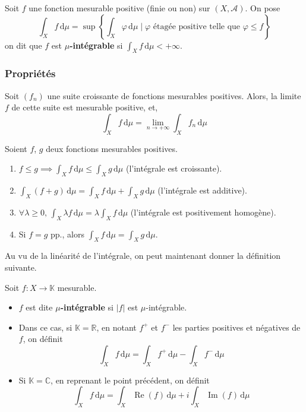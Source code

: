   \begin{definition}
    Soit $f$ une fonction mesurable positive (finie ou non) sur $(X, \mathcal{A})$. On pose
    \[ \int_X f \, \mathrm{d}\mu = \sup \left\{ \int_X \varphi \, \mathrm{d}\mu \mid \varphi \text{ étagée positive telle que } \varphi \leq f \right\} \]
    on dit que $f$ est \textbf{$\mu$-intégrable} si $\int_X f \, \mathrm{d}\mu < +\infty$.
  \end{definition}

  \subsubsection{Propriétés}

  \begin{theorem}
    Soit $(f_n)$ une suite croissante de fonctions mesurables positives. Alors, la limite $f$ de cette suite est mesurable positive, et,
    \[ \int_X f \, \mathrm{d}\mu = \lim_{n \rightarrow +\infty} \int_X f_n \, \mathrm{d}\mu \]
  \end{theorem}

  \begin{corollary}
    Soient $f$, $g$ deux fonctions mesurables positives.
    \begin{enumerate}[label={\bfseries(\roman*)}]
      \item $f \leq g \implies \int_X f \, \mathrm{d}\mu \leq \int_X g \, \mathrm{d}\mu$ (l'intégrale est croissante).
      \item $\int_X (f+g) \, \mathrm{d}\mu = \int_X f \, \mathrm{d}\mu + \int_X g \, \mathrm{d}\mu$ (l'intégrale est additive).
      \item $\forall \lambda \geq 0, \, \int_X \lambda f \, \mathrm{d}\mu = \lambda \int_X f \, \mathrm{d}\mu$ (l'intégrale est positivement homogène).
      \item Si $f = g$ pp., alors $\int_X f \, \mathrm{d}\mu = \int_X g \, \mathrm{d}\mu$.
    \end{enumerate}
  \end{corollary}

  Au vu de la linéarité de l'intégrale, on peut maintenant donner la définition suivante.


  \begin{definition}
    Soit $f : X \rightarrow \mathbb{K}$ mesurable.
    \begin{itemize}
      \item $f$ est dite \textbf{$\mu$-intégrable} si $\vert f \vert$ est $\mu$-intégrable.
      \item Dans ce cas, si $\mathbb{K} = \mathbb{R}$, en notant $f^+$ et $f^-$ les parties positives et négatives de $f$, on définit
      \[ \int_X f \, \mathrm{d}\mu = \int_X f^+ \, \mathrm{d}\mu - \int_X f^- \, \mathrm{d}\mu \]
      \item Si $\mathbb{K} = \mathbb{C}$, en reprenant le point précédent, on définit
      \[ \int_X f \, \mathrm{d}\mu = \int_X \operatorname{Re}(f) \, \mathrm{d}\mu + i \int_X \operatorname{Im}(f)  \, \mathrm{d}\mu \]
    \end{itemize}
  \end{definition}

